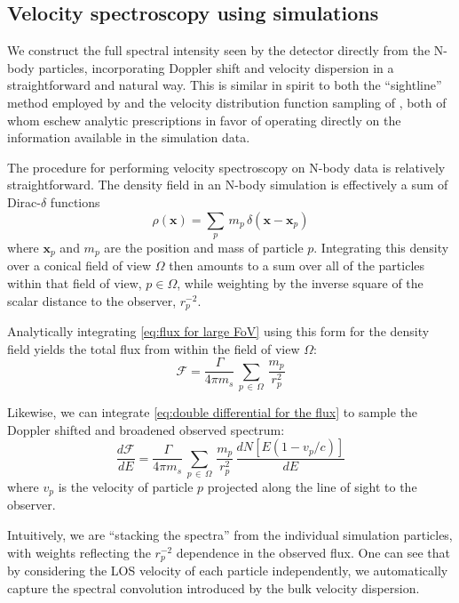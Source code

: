 \documentclass[aps,prl,10pt,twocolumn,superscriptaddress,showpacs]{revtex4-1}
\newcommand{\bvec}[1]{\mathbf{#1}}
\begin{document}
{

\subsection{Velocity spectroscopy using simulations}
\label{sec:simulations}

We construct the full
spectral intensity seen by the detector directly from the N-body particles, incorporating Doppler shift
and velocity dispersion in a straightforward and natural way.   This is similar in spirit to both the ``sightline'' method employed by 
\cite{lovell2015} and the velocity distribution function sampling of \cite{mao2013}, both of whom
eschew analytic prescriptions in favor of operating directly on the information available in the
simulation data. 

The procedure for performing velocity spectroscopy on N-body data is relatively straightforward.
The density field in an N-body simulation is effectively a sum of Dirac-$\delta$ functions
$$
\rho(\bvec{x}) = \sum_p\, m_p\, \delta(\bvec{x}-\bvec{x}_p)
$$
where $\bvec{x}_p$ and $m_p$ are the position and mass of particle $p$. Integrating this density over a conical
field of view $\Omega$ then amounts to a sum over all of the particles within that field of view, $p \in
\Omega$, while weighting by the inverse square of the scalar distance to the observer, $r^{-2}_p$. 

Analytically integrating \eqref{eq:flux for large FoV} using this form for the density field yields the
total flux from within the field of view $\Omega$:
\begin{equation} 
	\mathcal{F} = \frac{\Gamma}{4\pi m_s}
	\, \sum_{p \, \in \, \Omega} \, \frac{m_p}{r_p^{2}} 
\end{equation}

Likewise, we can integrate \eqref{eq:double differential for the flux} to sample the Doppler shifted
and broadened observed spectrum:
\begin{equation} \label{eq:discrete}
	\frac{d\mathcal{F}}{dE} = \frac{\Gamma}{4 \pi m_s}\, \sum_{p \, \in \, \Omega}
	\, \frac{m_p}{r_p^{2}} \, \frac{dN[E(1-v_p/c)]}{dE}
\end{equation}
where $v_p$ is the velocity of particle $p$ projected along the line of sight to the observer.

Intuitively, we are ``stacking the spectra'' from the individual simulation
particles, with weights reflecting the $r_p^{-2}$ dependence in the observed flux. One can see that by
considering the LOS velocity of each particle independently, we automatically capture the spectral
convolution introduced by the bulk velocity dispersion. 

}
\end{document}
